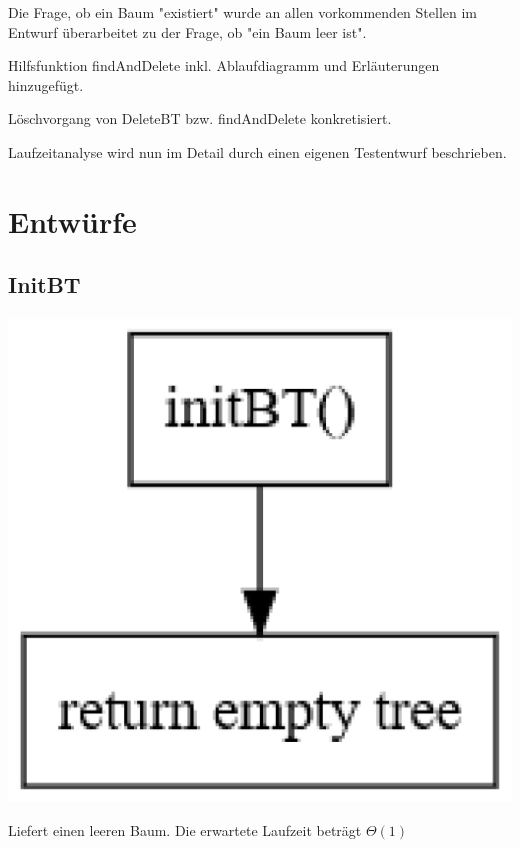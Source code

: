 \documentclass[11pt]{article}
\begin{document}
    Die Frage, ob ein Baum "existiert" wurde an allen vorkommenden Stellen im Entwurf überarbeitet zu der Frage, ob "ein Baum leer ist".
    
    Hilfsfunktion findAndDelete inkl. Ablaufdiagramm und Erläuterungen hinzugefügt.
    
    Löschvorgang von DeleteBT bzw. findAndDelete konkretisiert.
    
    Laufzeitanalyse wird nun im Detail durch einen eigenen Testentwurf beschrieben.


    \section{Entwürfe}\label{sec:entwuerfe}

    \subsection{InitBT}\label{subsec:initbt}
    
    \begin{center}
        \includegraphics[width=1\columnwidth] {init.pdf}
    \end{center}
    
    Liefert einen leeren Baum.
    Die erwartete Laufzeit beträgt
    \begin{math}
        \Theta(1)
    \end{math}
\end{document}

